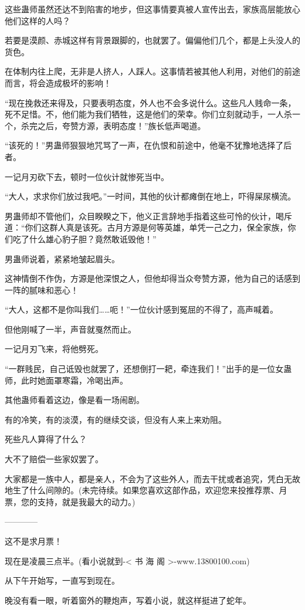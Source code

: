\begin{this_body}
这些蛊师虽然还达不到陷害的地步，但这事情要真被人宣传出去，家族高层能放心他们这样的人吗？

若要是漠颜、赤城这样有背景跟脚的，也就罢了。偏偏他们几个，都是上头没人的货色。

在体制内往上爬，无非是人挤人，人踩人。这事情若被其他人利用，对他们的前途而言，将会造成极坏的影响！

“现在挽救还来得及，只要表明态度，外人也不会多说什么。这些凡人贱命一条，死不足惜。不，他们能为我们牺牲，这是他们的荣幸。你们立刻就动手，一人杀一个，杀完之后，夸赞方源，表明态度！”族长低声喝道。

“该死的！”男蛊师狠狠地咒骂了一声，在仇恨和前途中，他毫不犹豫地选择了后者。

一记月刃砍下去，顿时一位伙计就惨死当中。

“大人，求求你们放过我吧。”一时间，其他的伙计都瘫倒在地上，吓得屎尿横流。

男蛊师却不管他们，众目睽睽之下，他义正言辞地手指着这些可怜的伙计，喝斥道：“你们这群人真是该死。古月方源是何等英雄，单凭一己之力，保全家族，你们吃了什么雄心豹子胆？竟然敢诋毁他！”

男蛊师说着，紧紧地皱起眉头。

这神情倒不作伪，方源是他深恨之人，但他却得当众夸赞方源，他为自己的话感到一阵的腻味和恶心！

“大人，这都不是你叫我们……呃！”一位伙计感到冤屈的不得了，高声喊着。

但他刚喊了一半，声音就戛然而止。

一记月刃飞来，将他劈死。

“一群贱民，自己诋毁也就罢了，还想倒打一耙，牵连我们！”出手的是一位女蛊师，此时她面罩寒霜，冷喝出声。

其他蛊师看着这边，像是看一场闹剧。

有的冷笑，有的淡漠，有的继续交谈，但没有人来上来劝阻。

死些凡人算得了什么？

大不了赔偿一些家奴罢了。

大家都是一族中人，都是亲人，不会为了这些外人，而去干扰或者追究，凭白无故地生了什么间隙的。(未完待续。如果您喜欢这部作品，欢迎您来投推荐票、月票，您的支持，就是我最大的动力。)

------------

这不是求月票！

现在是凌晨三点半。(看小说就到-< 书 海 阁 >-www.13800100.com)

从下午开始写，一直写到现在。

晚没有看一眼，听着窗外的鞭炮声，写着小说，就这样挺进了蛇年。


\end{this_body}
